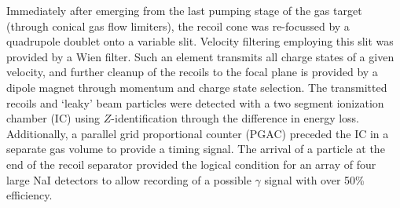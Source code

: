Immediately after emerging from the last pumping stage of the gas target (through conical gas flow limiters), the recoil cone was re-focussed by a quadrupole doublet onto a variable slit. Velocity filtering employing this slit was provided by a Wien filter. Such an element transmits all charge states of a given velocity, and further cleanup of the recoils to the focal plane is provided by a dipole magnet through momentum and charge state selection. The transmitted recoils and `leaky' beam particles were detected with a two segment ionization chamber (IC) using $Z$-identification through the difference in energy loss. Additionally, a parallel grid proportional counter (PGAC) preceded the IC in a separate gas volume to provide a timing signal. The arrival of a particle at the end of the recoil separator provided the logical condition for an array of four large NaI detectors to allow recording of a possible $\gamma$ signal with over 50\% efficiency.

